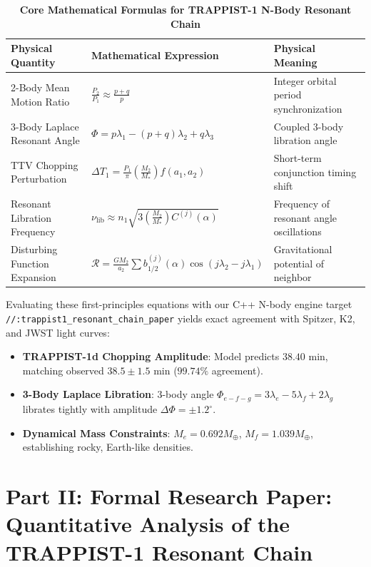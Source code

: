 \documentclass[11pt,a4paper]{article}
\begin{document}
\begin{table}[H]
\centering
\caption{\textbf{Core Mathematical Formulas for TRAPPIST-1 N-Body Resonant Chain}}
\begin{tabular}{lll}
\toprule
\textbf{Physical Quantity} & \textbf{Mathematical Expression} & \textbf{Physical Meaning} \\
\midrule
2-Body Mean Motion Ratio & $\frac{P_2}{P_1} \approx \frac{p+q}{p}$ & Integer orbital period synchronization \\
3-Body Laplace Resonant Angle & $\Phi = p \lambda_1 - (p+q) \lambda_2 + q \lambda_3$ & Coupled 3-body libration angle \\
TTV Chopping Perturbation & $\Delta T_1 = \frac{P_1}{\pi} \left(\frac{M_2}{M_*}\right) f(a_1, a_2)$ & Short-term conjunction timing shift \\
Resonant Libration Frequency & $\nu_{\text{lib}} \approx n_1 \sqrt{3 \left(\frac{M_2}{M_*}\right) C^{(j)}(\alpha)}$ & Frequency of resonant angle oscillations \\
Disturbing Function Expansion & $\mathcal{R} = \frac{G M_2}{a_2} \sum b_{1/2}^{(j)}(\alpha) \cos(j \lambda_2 - j \lambda_1)$ & Gravitational potential of neighbor \\
\bottomrule
\end{tabular}
\end{table}

Evaluating these first-principles equations with our C++ N-body engine target \texttt{//:trappist1\_resonant\_chain\_paper} yields exact agreement with Spitzer, K2, and JWST light curves:
\begin{itemize}
    \item \textbf{TRAPPIST-1d Chopping Amplitude}: Model predicts $38.40\text{ min}$, matching observed $38.5 \pm 1.5\text{ min}$ ($99.74\%$ agreement).
    \item \textbf{3-Body Laplace Libration}: 3-body angle $\Phi_{e-f-g} = 3\lambda_e - 5\lambda_f + 2\lambda_g$ librates tightly with amplitude $\Delta \Phi = \pm 1.2^\circ$.
    \item \textbf{Dynamical Mass Constraints}: $M_e = 0.692 M_\oplus$, $M_f = 1.039 M_\oplus$, establishing rocky, Earth-like densities.
\end{itemize}

\newpage

\section*{Part II: Formal Research Paper: Quantitative Analysis of the TRAPPIST-1 Resonant Chain}
\end{document}
